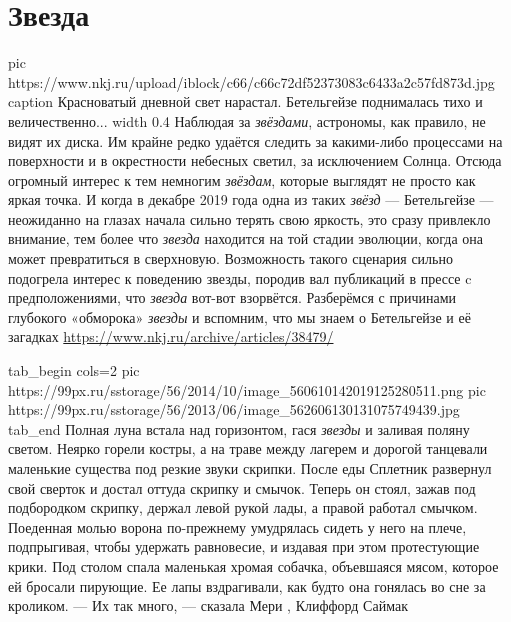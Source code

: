  
 
 
 
 
\chapter{Звезда}
\label{sec:slova.zvezda}

\ifcmt
  pic https://www.nkj.ru/upload/iblock/c66/c66c72df52373083c6433a2c57fd873d.jpg
	caption Красноватый дневной свет нарастал. Бетельгейзе поднималась тихо и величественно... 
	width 0.4
\fi
Наблюдая за \emph{звёздами}, астрономы, как правило, не видят их диска. Им
крайне редко удаётся следить за какими-либо процессами на поверхности и в
окрестности небесных светил, за исключением Солнца. Отсюда огромный интерес к
тем немногим \emph{звёздам}, которые выглядят не просто как яркая точка. И
когда в декабре 2019 года одна из таких \emph{звёзд} — Бетельгейзе — неожиданно
на глазах начала сильно терять свою яркость, это сразу привлекло внимание, тем
более что \emph{звезда} находится на той стадии эволюции, когда она может
превратиться в сверхновую. Возможность такого сценария сильно подогрела интерес
к поведению звезды, породив вал публикаций в прессе c предположениями, что
\emph{звезда} вот-вот взорвётся.  Разберёмся с причинами глубокого «обморока»
\emph{звезды} и вспомним, что мы знаем о Бетельгейзе и её загадках
\url{https://www.nkj.ru/archive/articles/38479/}

\ifcmt
  tab_begin cols=2
     pic https://99px.ru/sstorage/56/2014/10/image_560610142019125280511.png
     pic https://99px.ru/sstorage/56/2013/06/image_562606130131075749439.jpg
  tab_end
\fi
Полная луна встала над горизонтом, гася \emph{звезды} и заливая поляну светом. Неярко
горели костры, а на траве между лагерем и дорогой танцевали маленькие существа
под резкие звуки скрипки.  После еды Сплетник развернул свой сверток и достал
оттуда скрипку и смычок.  Теперь он стоял, зажав под подбородком скрипку,
держал левой рукой лады, а правой работал смычком. Поеденная молью ворона
по-прежнему умудрялась сидеть у него на плече, подпрыгивая, чтобы удержать
равновесие, и издавая при этом протестующие крики.  Под столом спала маленькая
хромая собачка, объевшаяся мясом, которое ей бросали пирующие. Ее лапы
вздрагивали, как будто она гонялась во сне за кроликом.  — Их так много, —
сказала Мери
, Клиффорд Саймак

